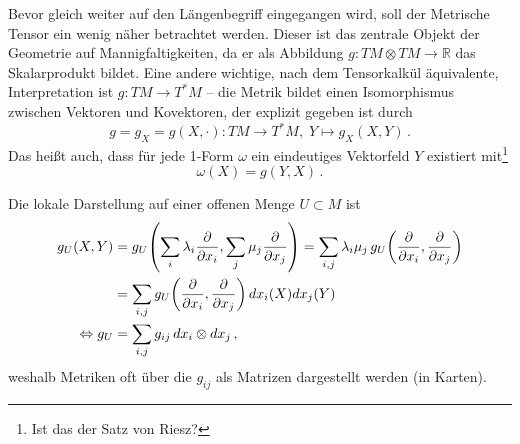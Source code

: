 \iffalse
{
Auch für Riemannsche Metriken lässt sich eine lokale Darstellung berechnen. Mit einer Karte $x = (x_1, \dots, x_n): U \rightarrow \mathbb{R}^n$ auf der offenen Teilmenge $U \subset M$ sowie zwei Vektorfeldern $X, Y$ mit $v, w$ als lokalen Darstellungen an $p \in M$ gilt
\begin{equation}
g_U = \sum_{i, j} g_{ij} \, dx_i \otimes dx_j
\; \text{ mit } \; g_{ij} = g_U\qty(\pdv{x_i}, \pdv{x_j}): U \rightarrow \mathbb{R}
\end{equation}
Die Komponenten $g_{ij}$ werden dabei oft in eine Matrix geschrieben, um so eine praktische Darstellung des metrischen Tensors zu erhalten.
}
\fi


Bevor gleich weiter auf den Längenbegriff eingegangen wird, soll der Metrische Tensor ein wenig näher betrachtet werden. Dieser ist das zentrale Objekt der Geometrie auf Mannigfaltigkeiten, da er als Abbildung $g: TM \otimes TM \rightarrow \mathbb{R}$ das Skalarprodukt bildet. Eine andere wichtige, nach dem Tensorkalkül äquivalente, Interpretation ist $g: TM \rightarrow T^*M$ -- die Metrik bildet einen Isomorphismus zwischen Vektoren und Kovektoren, der explizit gegeben ist durch
\begin{equation}
g = g_X = g(X, \cdot): TM \rightarrow T^*M, \; Y \mapsto g_X(X, Y) \, .
\end{equation}
Das heißt auch, dass für jede 1-Form $\omega$ ein eindeutiges Vektorfeld $Y$ existiert mit\footnote{Ist das der Satz von Riesz?}
\begin{equation}
\omega(X) = g(Y, X) \, .
\end{equation}

Die lokale Darstellung auf einer offenen Menge $U \subset M$ ist
\begin{align}
g_U(X, Y) &= g_U\qty(\sum_i \lambda_i \pdv{x_i}, \sum_j \mu_j \pdv{x_j}) = \sum_{i, j} \lambda_i \mu_j \, g_U\qty(\pdv{x_i}, \pdv{x_j})
\notag\\
&= \sum_{i, j} g_U\qty(\pdv{x_i}, \pdv{x_j}) \, dx_i(X) dx_j(Y)
\notag\\
\Leftrightarrow g_U &= \sum_{i, j} g_{ij} \, dx_i \otimes dx_j \, ,
\end{align}
weshalb Metriken oft über die $g_{ij}$ als Matrizen dargestellt werden (in Karten).


